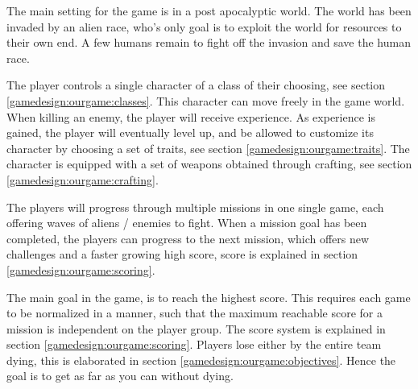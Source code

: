 
The main setting for the game is in a post apocalyptic world.
The world has been invaded by an alien race, who's only goal is to exploit the world for resources to their own end. 
A few humans remain to fight off the invasion and save the human race. 

The player controls a single character of a class of their choosing, see section \ref{gamedesign:ourgame:classes}. 
This character can move freely in the game world.
When killing an enemy, the player will receive experience.
As experience is gained, the player will eventually level up, and be allowed to customize its character by choosing a set of traits, see section \ref{gamedesign:ourgame:traits}.
The character is equipped with a set of weapons obtained through crafting, see section \ref{gamedesign:ourgame:crafting}.

The players will progress through multiple missions in one single game, each offering waves of aliens / enemies to fight. 
When a mission goal has been completed, the players can progress to the next mission, which offers new challenges and a faster growing high score, score is explained in section \ref{gamedesign:ourgame:scoring}.

The main goal in the game, is to reach the highest score. 
This requires each game to be normalized in a manner, such that the maximum reachable score for a mission is independent on the player group.
The score system is explained in section \ref{gamedesign:ourgame:scoring}. 
Players lose either by the entire team dying, this is elaborated in section \ref{gamedesign:ourgame:objectives}. 
Hence the goal is to get as far as you can without dying.




